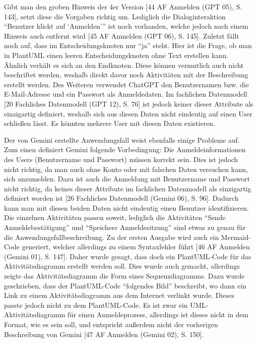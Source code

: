 Gibt man den groben Hinweis der 4er Version [44 AF Anmelden (GPT 05), S. 143], setzt diese die Vorgaben richtig um. Lediglich die 
Dialoginteraktion ``Benutzer klickt auf `Anmelden''' ist noch vorhanden, welche jedoch nach einem Hinweis auch entfernt wird 
[45 AF Anmelden (GPT 06), S. 145]. Zuletzt fällt noch auf, dass im Entscheidungsknoten nur ``ja'' steht. Hier ist die Frage, ob man in PlantUML 
einen leeren Entscheidungsknoten ohne Text erstellen kann. Ähnlich verhält es sich an den Endknoten. Diese können vermutlich auch nicht 
beschriftet werden, weshalb direkt davor noch Aktivitäten mit der Beschreibung erstellt werden. Des Weiteren verwendet ChatGPT den Benutzernamen 
bzw. die E-Mail-Adresse und ein Passwort als Anmeldedaten. Im fachlichen Datenmodell [20 Fachliches Datenmodell (GPT 12), S. 76] ist jedoch 
keiner dieser Attribute als einzigartig definiert, weshalb sich aus diesen Daten nicht eindeutig auf einen User schließen lässt. Es könnten 
mehrere User mit diesen Daten existieren.

Der von Gemini erstellte Anwendungsfall weist ebenfalls einige Probleme auf. Zum einen definiert Gemini folgende Vorbedingung: Die 
Anmeldeinformationen des Users (Benutzername und Passwort) müssen korrekt sein. Dies ist jedoch nicht richtig, da man auch ohne Konto 
oder mit falschen Daten versuchen kann, sich anzumelden. Dazu ist auch die Anmeldung mit Benutzername und Passwort nicht richtig, da keines 
dieser Attribute im fachlichen Datenmodell als einzigartig definiert worden ist [26 Fachliches Datenmodell (Gemini 06), S. 96]. Dadurch 
kann man mit diesen beiden Daten nicht eindeutig einen Benutzer identifizieren. Die einzelnen Aktivitäten passen soweit, lediglich die 
Aktivitäten ``Sende Anmeldebestätigung'' und ``Speichere Anmeldesitzung'' sind etwas zu genau für die Anwendungsfallbeschreibung. Zu der ersten 
Ausgabe wird auch ein Mermaid-Code generiert, welcher allerdings zu einem Syntaxfehler führt [46 AF Anmelden (Gemini 01), S. 147]. Daher 
wurde gesagt, dass doch ein PlantUML-Code für das Aktivitätsdiagramm erstellt werden soll. Dies wurde auch gemacht, allerdings zeigte das 
Aktivitätsdiagramm die Form eines Sequenzdiagramms. Dazu wurde geschrieben, dass der PlantUML-Code ``folgendes Bild'' beschreibt, wo dann ein 
Link zu einem Aktivitätsdiagramm aus dem Internet verlinkt wurde. Dieses passte jedoch nicht zu dem PlantUML-Code. Es ist zwar ein 
UML-Aktivitätsdiagramm für einen Anmeldeprozess, allerdings ist dieses nicht in dem Format, wie es sein soll, und entspricht außerdem nicht 
der vorherigen Beschreibung von Gemini [47 AF Anmelden (Gemini 02), S. 150].

